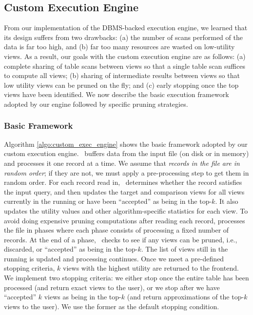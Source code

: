 

\subsection{Custom Execution Engine}
\label{sec:in_memory_execution_engine}

From our implementation of the DBMS-backed execution engine, 
we learned that its design suffers from two drawbacks:
(a) the number of scans performed of the data is far too high, and
(b) far too many resources are wasted on low-utility views.
As a result, our goals with the custom execution engine are as follows:
(a) complete sharing of table scans between views so that a single table scan
suffices to compute all views; 
(b) sharing of intermediate results between views so that low utility views can
be pruned on the fly; and 
(c) early stopping once the top views have been identified. 
We now describe the
basic execution framework adopted by our engine followed by specific
pruning strategies.

\subsubsection{Basic Framework}
\label{subsec:basic_framework}
Algorithm \ref{algo:custom_exec_engine} shows the basic framework adopted by our
custom execution engine.
\VizRecDB\ buffers data from the input file (on disk or in memory) and processes it
one record at a time.
We assume that {\it records in the file are in random order}; if they are not,
we must apply a pre-processing step to get them in random order.
For each record read in, \VizRecDB\ determines whether the record satisfies the
input query, and then updates the target and comparison views for all views
currently in the running or have been ``accepted'' as being in the top-$k$.
It also updates the utility values and other algorithm-specific statistics for
each view.
To avoid doing expensive pruning computations after reading each record,
\VizRecDB processes the file in phases where each phase consists of processing a
fixed number of records.
At the end of a phase, \VizRecDB\ checks to see if any views can be pruned,
i.e., discarded, or ``accepted'' as being in the top-$k$.
The list of views still in the running is updated and processing continues.
Once we meet a pre-defined stopping criteria, $k$ views with the
highest utility are returned to the frontend.
We implement two stopping criteria: we either stop once the entire table has
been processed (and return exact views to the user), or we stop after
we have ``accepted'' $k$ views as being in the top-$k$ (and return
approximations of the top-$k$ views to the user).
We use the former as the default stopping condition.

